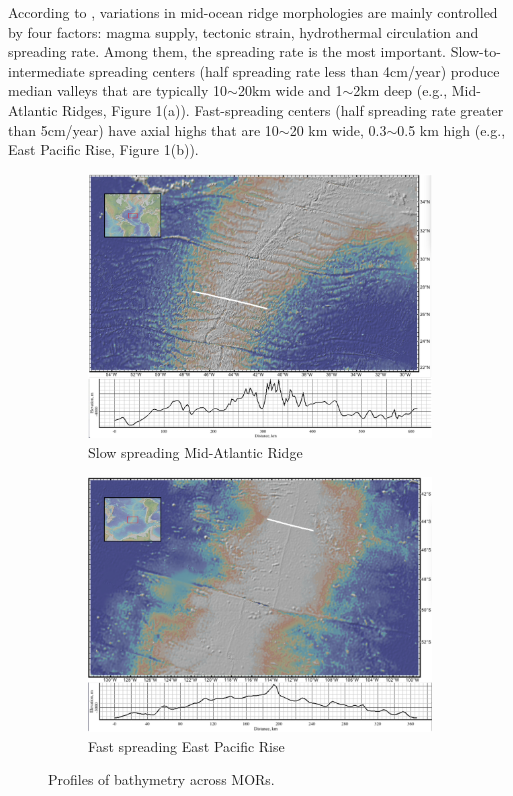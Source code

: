 \documentclass[12pt]{article}
\begin{document}
According to \citep{Fowler2004}, variations in  mid-ocean ridge morphologies are mainly controlled by four factors: magma supply, tectonic strain, hydrothermal circulation and spreading rate. Among them, the spreading rate is the most important. Slow-to-intermediate spreading centers (half spreading rate less than 4cm/year) produce median valleys that are typically 10$\sim$20km wide and 1$\sim$2km deep (e.g., Mid-Atlantic Ridges, Figure 1(a)). Fast-spreading centers (half spreading rate greater than 5cm/year) have axial highs that are 10$\sim$20 km wide, 0.3$\sim$0.5 km high (e.g., East Pacific Rise, Figure 1(b)).

\begin{figure}[H]
\centering
\begin{subfigure}{.5\textwidth}
  \centering
  \includegraphics[width=.8\linewidth]{fig1_1.png}
  \caption{\small{Slow spreading Mid-Atlantic Ridge}}
  \label{fig1_1}
\end{subfigure}%
\begin{subfigure}{.5\textwidth}
  \centering
  \includegraphics[width=.8\linewidth]{fig1_3.png}
  \caption{\small{Fast spreading East Pacific Rise}}
  \label{fig1_3}
\end{subfigure}
\caption{\small{Profiles of bathymetry across MORs.}}
\label{fig1}
\end{figure}
\end{document}
